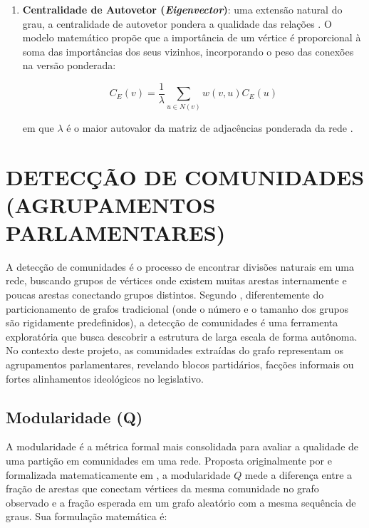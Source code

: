 \documentclass[
      12pt,
      a4paper,
      openright,
      oneside,
      chapter=TITLE,
      section=TITLE,
      english,
      french,
      spanish,
      brazilian
    ]{abntex2}
\begin{document}
\begin{enumerate}[label=\alph*)]
        onde $C_C(v)$ é o inverso da soma das distâncias geodésicas do vértice $v$ a todos os outros vértices da rede.
        
        \item \textbf{Centralidade de Autovetor (\textit{Eigenvector})}: uma extensão natural do grau, a centralidade de autovetor pondera a qualidade das relações \cite{bonacich1972}. O modelo matemático propõe que a importância de um vértice é proporcional à soma das importâncias dos seus vizinhos, incorporando o peso das conexões na versão ponderada:
    
        \begin{equation}
        C_E(v) = \frac{1}{\lambda} \sum_{u \in N(v)} w(v,u) C_E(u)
        \label{eq:eigenvector}
        \end{equation}
    
        em que $\lambda$ é o maior autovalor da matriz de adjacências ponderada da rede \cite{bonacich1987}.
    \end{enumerate}
    
    \section{DETECÇÃO DE COMUNIDADES (AGRUPAMENTOS PARLAMENTARES)}
    
    A detecção de comunidades é o processo de encontrar divisões naturais em uma rede, buscando grupos de vértices onde existem muitas arestas internamente e poucas arestas conectando grupos distintos. Segundo , diferentemente do particionamento de grafos tradicional (onde o número e o tamanho dos grupos são rigidamente predefinidos), a detecção de comunidades é uma ferramenta exploratória que busca descobrir a estrutura de larga escala de forma autônoma. No contexto deste projeto, as comunidades extraídas do grafo representam os agrupamentos parlamentares, revelando blocos partidários, facções informais ou fortes alinhamentos ideológicos no legislativo.
    
    \subsection{Modularidade (Q)}
    
    A modularidade é a métrica formal mais consolidada para avaliar a qualidade de uma partição em comunidades em uma rede. Proposta originalmente por \cite{newman2004} e formalizada matematicamente em \cite{newman2010}, a modularidade $Q$ mede a diferença entre a fração de arestas que conectam vértices da mesma comunidade no grafo observado e a fração esperada em um grafo aleatório com a mesma sequência de graus. Sua formulação matemática é:
    
\end{document}
